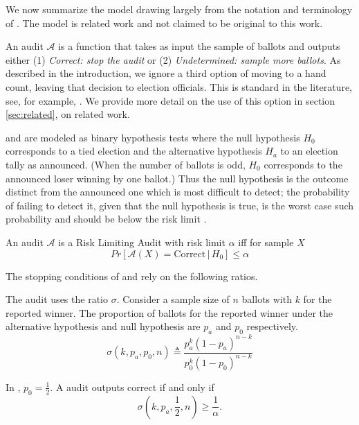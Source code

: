 
We now summarize the model drawing largely from the notation and terminology of \cite{usenix_minerva,arxiv_athena,simulations,bravo}. The model is related work and not claimed to be original to this work. 

An audit $\mathcal{A}$ is a function that takes as input the sample of ballots and outputs either (1) \emph{Correct: stop the audit} or (2) \emph{Undetermined: sample more ballots}. As described in the introduction, we ignore a third option of moving to a hand count, leaving that decision to election officials. This is standard in the literature, see, for example, \cite{bravo}. We provide more detail on the use of this option in section \ref{sec:related}, on related work. 

\BRAVO and \Minerva are modeled as binary hypothesis tests where the null hypothesis $H_0$ corresponds to a tied election and the alternative hypothesis $H_a$ to an election tally as announced. 
(When the number of ballots is odd, $H_0$ corresponds to the announced loser winning by one ballot.)
Thus the null hypothesis is the outcome distinct from the announced one which is most difficult to detect; the probability of failing to detect it, given that the null hypothesis is true, is the worst case such probability and should be below the risk limit \cite{Bayesian-RLA}.

\begin{definition}
An audit $\mathcal{A}$ is a Risk Limiting Audit with 
risk limit $\alpha$ iff for sample $X$
$$
Pr[\mathcal{A}(X) 
= \text{Correct} \,|\, H_0]\le \alpha
$$
\end{definition}

The stopping conditions of \BRAVO and \Minerva rely on the following ratios.

\begin{definition} \label{def:bravo-ratio} The \BRAVO audit uses the ratio $\sigma$. Consider a sample size of $n$ ballots with $k$ for the reported winner. The proportion of ballots for the reported winner under the alternative hypothesis and null hypothesis are $p_a$ and $p_0$ respectively.
\begin{equation}
    \sigma(k, p_a, p_0, n) \triangleq \frac{p_a^{k} (1-p_a)^{n-k}}{p_0^{k} (1-p_0)^{n-k}} 
    \label{eqn:bravoratio}
\end{equation}
\end{definition}

In \BRAVO, $p_0=\frac{1}{2}$. A \BRAVO audit outputs correct if and only if
$$\sigma(k,p_a,\frac{1}{2},n)\ge \frac{1}{\alpha}.$$

